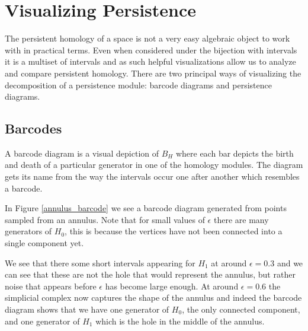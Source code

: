 \section{Visualizing Persistence}
The persistent homology of a space is not a very easy algebraic object to work with in practical terms. Even when considered under the bijection with intervals it is a multiset of intervals and as such helpful visualizations allow us to analyze and compare persistent homology. There are two principal ways of visualizing the decomposition of a persistence module: barcode diagrams and persistence diagrams.

\subsection{Barcodes}
A barcode diagram is a visual depiction of $B_{H}$ where each bar depicts the birth and death of a particular generator in one of the homology modules. The diagram gets its name from the way the intervals occur one after another which resembles a barcode.

In Figure \ref{annulus_barcode} we see a barcode diagram generated from points sampled from an annulus. Note that for small values of $\epsilon$ there are many generators of $H_{0}$, this is because the vertices have not been connected into a single component yet.

  We see that there some short intervals appearing for $H_{1}$ at around $\epsilon=0.3$ and we can see that these are not the hole that would represent the annulus, but rather noise that appears before $\epsilon$ has become large enough. At around $\epsilon=0.6$ the simplicial complex now captures the shape of the annulus and indeed the barcode diagram shows that we have one generator of $H_{0}$, the only connected component, and one generator of $H_{1}$ which is the hole in the middle of the annulus.

